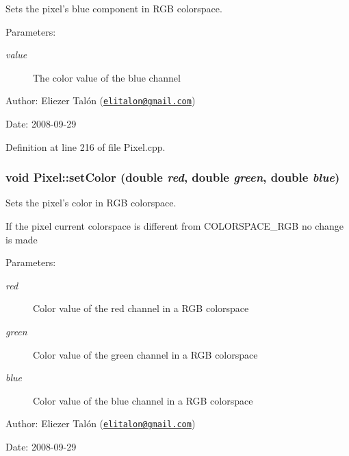 Sets the pixel's blue component in RGB colorspace. 

\begin{Desc}
\item[Parameters:]
\begin{description}
\item[{\em value}]The color value of the blue channel\end{description}
\end{Desc}
\begin{Desc}
\item[Author:]Eliezer Talón (\href{mailto:elitalon@gmail.com}{\tt elitalon@gmail.com}) \end{Desc}
\begin{Desc}
\item[Date:]2008-09-29 \end{Desc}


Definition at line 216 of file Pixel.cpp.\hypertarget{class_pixel_5543267a64a29c66f12a2801b101e6db}{
\subsubsection[setColor]{\setlength{\rightskip}{0pt plus 5cm}void Pixel::setColor (double {\em red}, \/  double {\em green}, \/  double {\em blue})}}
\label{class_pixel_5543267a64a29c66f12a2801b101e6db}


Sets the pixel's color in RGB colorspace. 

If the pixel current colorspace is different from COLORSPACE\_\-RGB no change is made

\begin{Desc}
\item[Parameters:]
\begin{description}
\item[{\em red}]Color value of the red channel in a RGB colorspace \item[{\em green}]Color value of the green channel in a RGB colorspace \item[{\em blue}]Color value of the blue channel in a RGB colorspace\end{description}
\end{Desc}
\begin{Desc}
\item[Author:]Eliezer Talón (\href{mailto:elitalon@gmail.com}{\tt elitalon@gmail.com}) \end{Desc}
\begin{Desc}
\item[Date:]2008-09-29 \end{Desc}


